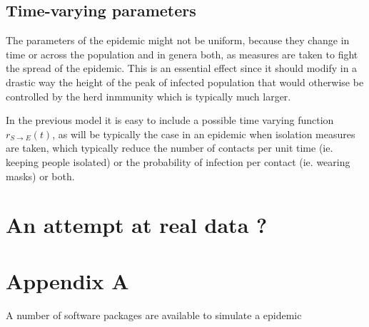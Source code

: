 \documentclass[a4paper,oneside,11pt]{article}
\begin{document}
{ \subsection{Time-varying parameters}
 
 The parameters of the epidemic might not be uniform, because they change in time or across the population and in genera both, as measures are taken to 
 fight the spread of the epidemic. This is an essential effect since it should modify in a drastic way the height of the peak of infected population that would otherwise
 be controlled by the herd inmmunity which is typically much larger. 

In the previous model it is easy to include a possible time varying function $r_{S\rightarrow E}(t)$, as will be typically the case in an epidemic when isolation measures are taken, which typically reduce the number of contacts per unit time (ie. keeping people isolated) or the probability of infection per contact (ie. wearing masks) or both. 

\section{An attempt at real data ?}

\section*{Appendix A} 

A number of software packages are available to simulate a epidemic 


  
   
 
 
 
}
\end{document}
